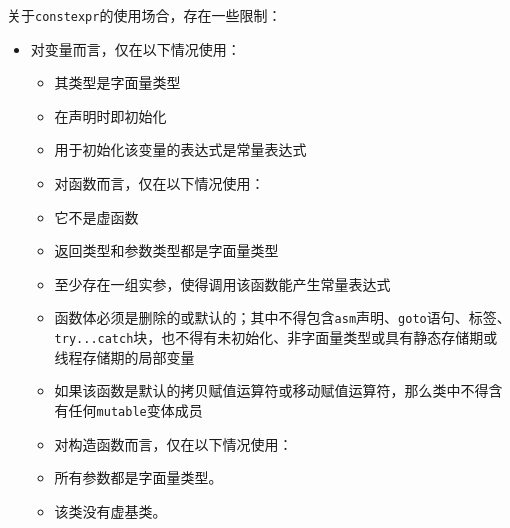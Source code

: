 
关于\texttt{constexpr}的使用场合，存在一些限制：



\begin{itemize}
\item 对变量而言，仅在以下情况使用：



\begin{itemize}
\item 其类型是字面量类型



\item 在声明时即初始化



\item 用于初始化该变量的表达式是常量表达式



\item 对函数而言，仅在以下情况使用：



\item 它不是虚函数



\item 返回类型和参数类型都是字面量类型



\item 至少存在一组实参，使得调用该函数能产生常量表达式



\item 函数体必须是删除的或默认的；其中不得包含\texttt{asm}声明、\texttt{goto}语句、标签、\texttt{try...\allowbreak{}catch}块，也不得有未初始化、非字面量类型或具有静态存储期或线程存储期的局部变量



\item 如果该函数是默认的拷贝赋值运算符或移动赋值运算符，那么类中不得含有任何\texttt{mutable}变体成员



\item 对构造函数而言，仅在以下情况使用：



\item 所有参数都是字面量类型。



\item 该类没有虚基类。



\end{itemize}
\end{itemize}
